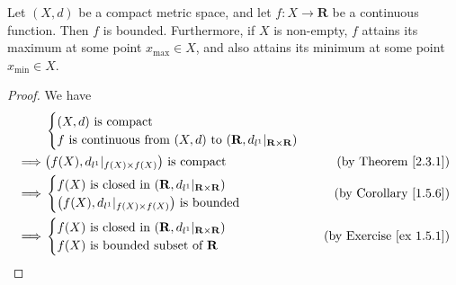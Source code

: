 \begin{proposition}\label{2.3.2}
    Let \((X, d)\) be a compact metric space, and let \(f : X \to \mathbf{R}\) be a continuous function.
    Then \(f\) is bounded.
    Furthermore, if \(X\) is non-empty, \(f\) attains its maximum at some point \(x_{\max} \in X\), and also attains its minimum at some point \(x_{\min} \in X\).
\end{proposition}

\begin{proof}
    We have
    \begin{align*}
                 & \begin{cases}
            (X, d) \text{ is compact} \\
            f \text{ is continuous from } (X, d) \text{ to } (\mathbf{R}, d_{l^1}|_{\mathbf{R} \times \mathbf{R}})
        \end{cases}                                                                            \\
        \implies & \big(f(X), d_{l^1}|_{f(X) \times f(X)}\big) \text{ is compact} & \text{(by Theorem \ref{2.3.1})}     \\
        \implies & \begin{cases}
            f(X) \text{ is closed in } (\mathbf{R}, d_{l^1}|_{\mathbf{R} \times \mathbf{R}}) \\
            \big(f(X), d_{l^1}|_{f(X) \times f(X)}\big) \text{ is bounded}
        \end{cases}                                      & \text{(by Corollary \ref{1.5.6})}   \\
        \implies & \begin{cases}
            f(X) \text{ is closed in } (\mathbf{R}, d_{l^1}|_{\mathbf{R} \times \mathbf{R}}) \\
            f(X) \text{ is bounded subset of } \mathbf{R}
        \end{cases}                                      & \text{(by Exercise \ref{ex 1.5.1})}
    \end{align*}


\end{proof}
